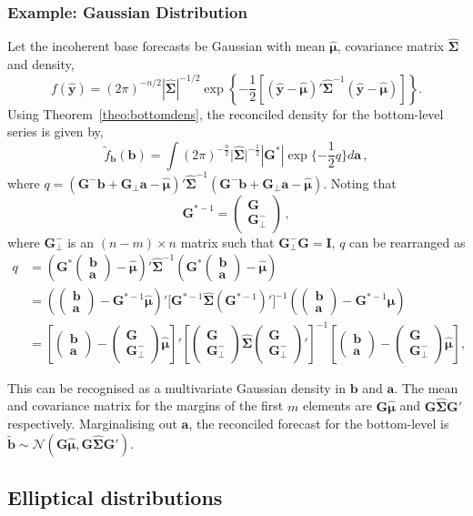 \documentclass[12pt]{article}
\def\PQ{\begin{pmatrix}\bm{G}\\[-0.2cm]\bm{G}_{\perp}^-\end{pmatrix}}
\def\bt{\begin{pmatrix}{\bm{b}}\\[-0.2cm]{\bm{a}}\end{pmatrix}}
\theoremstyle{definition}
\begin{document}
\subsubsection*{Example: Gaussian Distribution}

Let the incoherent base forecasts be Gaussian with mean $\hat{\bm{\mu}}$, covariance matrix $\hat{\bm{\Sigma}}$ and density,
\begin{equation}
f(\hat{\bm{y}})=(2\pi)^{-n/2}|\hat{\bm{\Sigma}}|^{-1/2}\exp\left\{-\frac{1}{2}\left[(\hat{\bm{y}}-\hat{\bm{\mu}})'\hat{\bm{\Sigma}}^{-1}(\hat{\bm{y}}-\hat{\bm{\mu}})\right]\right\}\nonumber.
\end{equation}
Using Theorem~\ref{theo:bottomdens}, the reconciled density for the bottom-level series is given by,
\begin{equation}
\tilde{f}_{\bm{b}}(\bm{b})=\int(2\pi)^{-\frac{n}{2}}\Big|\hat{\bm{\Sigma}}\Big|^{-\frac{1}{2}}|\bm{G^*}|\exp\{-\frac{1}{2}q\}d{\bm a}\nonumber\,,
\end{equation}
where $q=(\bm{G}^-{\bm{b}}+\bm{G}_{\perp}{\bm{a}}-\hat{\bm{\mu}})' \hat{\bm{\Sigma}}^{-1}(\bm{G}^-\bm{b}+\bm{G}_\perp\bm{a}-\hat{\bm{\mu}})$. Noting that
\[
\bm{G}^{*-1}=\begin{pmatrix}
\bm{G} \\\bm{G}_{\perp}^-
\end{pmatrix}\,,
\]
where $\bm{G}_{\perp}^-$ is an $(n-m)\times n$ matrix such that $\bm{G}_{\perp}^-\bm{G}=\bm{I}$, $q$ can be rearranged as
\begin{align*}
	q& =
	\left(\bm{G}^*\bt-\hat{\bm{\mu}}\right)' \hat{\bm{\Sigma}}^{-1}\left(\bm{G}^*\bt-\hat{\bm{\mu}}\right)\\
	& =
	\left(\bt-\bm{G}^{*-1}\hat{\bm{\mu}}\right)' \Big[\bm{G}^{*-1}\hat{\bm{\Sigma}}\left(\bm{G}^{*-1}\right)'\Big]^{-1}
	\left(\bt-\bm{G}^{*-1}\hat{\bm{\mu}}\right)\\
    & =\left[\bt-\PQ\hat{\bm{\mu}}\right]' \left[\PQ\hat{\bm{\Sigma}}\PQ'\right]^{-1}\left[\bt-\PQ\hat{\bm{\mu}}\right],
\end{align*}

This can be recognised as a multivariate Gaussian density in $\bm{b}$ and $\bm{a}$.  The mean and covariance matrix for the margins of the first $m$ elements are $\bm{G}\hat{\bm{\mu}}$ and $\bm{G}\hat{\bm{\Sigma}}\bm{G}'$ respectively.  Marginalising out $\bm {a}$, the reconciled forecast for the bottom-level is $\tilde{\bm{b}} \sim \mathcal{N}(\bm{G}\hat{\bm{\mu}}, \bm{G}\hat{\bm{\Sigma}}\bm{G}')$.

\subsection{Elliptical distributions}
\end{document}
